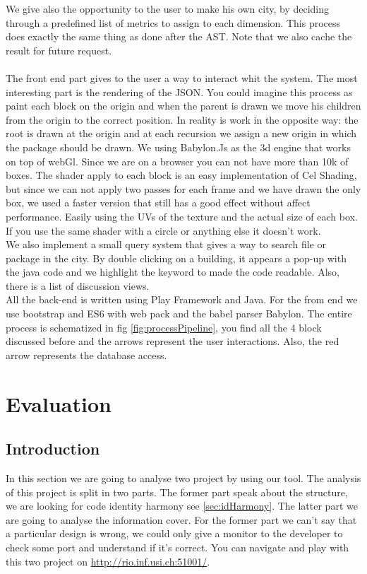 \documentclass[]{usiinfbachelorproject}
\begin{document}
We give also the opportunity to the user to make his own city, by deciding through a predefined list of metrics to assign to each dimension. This process does exactly the same thing as done after the AST. Note that we also cache the result for future request.\\ \\

The front end part gives to the user a way to interact whit the system. The most interesting part is the rendering of the JSON. You could imagine this process as paint each block on the origin and when the parent is drawn we move his children from the origin to the correct position. In reality is work in the opposite way: the root is drawn at the origin and at each recursion we assign a new origin in which the package should be drawn. We using Babylon.Js as the 3d engine that works on top of webGl. Since we are on a browser you can not have more than 10k of boxes. The shader apply to each block is an easy implementation of Cel Shading, but since we can not apply two passes for each frame and we have drawn the only box, we used a faster version that still has a good effect without affect performance. Easily using the UVs of the texture and the actual size of each box. If you use the same shader with a circle or anything else it doesn’t work.\\
We also implement a small query system that gives a way to search file or package in the city. By double clicking on a building, it appears a pop-up with the java code and we highlight the keyword to made the code readable. Also, there is a list of discussion views.\\
All the back-end is written using Play Framework and Java.  For the from end we use bootstrap and ES6 with web pack  and the babel parser Babylon.
The entire process is schematized in fig \ref{fig:processPipeline}, you find all the 4 block discussed before and the arrows represent the user interactions.
Also, the red arrow represents the database access. 





   





\newpage
\section{Evaluation} \label{evaluation}

\subsection{Introduction}
In this section we are going to analyse two project by using our tool. 
The analysis of this project is split in two parts. The former part speak about the structure, we are looking  for code identity harmony see \ref{sec:idHarmony}. The latter part we are going to analyse the information cover. 
For the former part we can't say that a particular design is wrong, we could only give a monitor to the developer to check some port and understand if it's correct.
You can navigate and play with this two project on \url{http://rio.inf.usi.ch:51001/}. 
\end{document}
